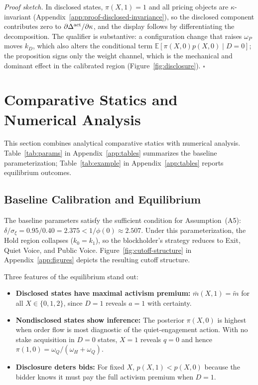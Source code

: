 \documentclass[11pt]{article}
\newcommand{\E}{\mathbb{E}}
\newcommand{\1}{\mathbf{1}}
\begin{document}
\textit{Proof sketch.} In disclosed states, $\pi(X,1)=1$ and all pricing objects are $\kappa$-invariant (Appendix~\ref{app:proof-disclosed-invariance}), so the disclosed component contributes zero to $\partial\Delta^{\textup{act}}/\partial\kappa$, and the display follows by differentiating the decomposition. The qualifier is substantive: a configuration change that raises $\omega_P$ moves $k_D$, which also alters the conditional term $\E[\pi(X,0)p(X,0)\mid D=0]$; the proposition signs only the weight channel, which is the mechanical and dominant effect in the calibrated region (Figure~\ref{fig:disclosure}). \hfill$\square$

\section{Comparative Statics and Numerical Analysis}
\label{sec:numerical}
\label{sec:comp-statics}

This section combines analytical comparative statics with numerical analysis. Table~\ref{tab:params} in Appendix~\ref{app:tables} summarizes the baseline parameterization; Table~\ref{tab:example} in Appendix~\ref{app:tables} reports equilibrium outcomes.

%
\subsection{Baseline Calibration and Equilibrium}
%

The baseline parameters satisfy the sufficient condition for Assumption~\textup{(A5)}: $\delta/\sigma_\xi = 0.95/0.40 = 2.375 < 1/\phi(0) \approx 2.507$. Under this parameterization, the Hold region collapses ($k_0=k_1$), so the blockholder's strategy reduces to Exit, Quiet Voice, and Public Voice. Figure~\ref{fig:cutoff-structure} in Appendix~\ref{app:figures} depicts the resulting cutoff structure.

Three features of the equilibrium stand out:
\begin{itemize}[leftmargin=2em,itemsep=2pt]
\item \textbf{Disclosed states have maximal activism premium:} $\bar{m}(X,1) = \tilde{m}$ for all $X \in \{0,1,2\}$, since $D=1$ reveals $a=1$ with certainty.
\item \textbf{Nondisclosed states show inference:} The posterior $\pi(X,0)$ is highest when order flow is most diagnostic of the quiet-engagement action. With no stake acquisition in $D=0$ states, $X=1$ reveals $q=0$ and hence $\pi(1,0)=\omega_Q/(\omega_H+\omega_Q)$.
\item \textbf{Disclosure deters bids:} For fixed $X$, $p(X,1) < p(X,0)$ because the bidder knows it must pay the full activism premium when $D=1$.
\end{itemize}
\end{document}
